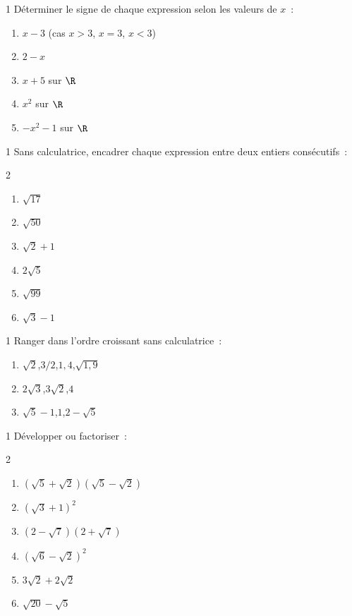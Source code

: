 \begin{exo}{1}
D\'eterminer le signe de chaque expression selon les valeurs de $x$~:
\begin{enumerate}
  \item $x - 3$ \quad (cas $x > 3$, $x = 3$, $x < 3$)
  \item $2 - x$
  \item $x + 5$ sur $\R$
  \item $x^2$ sur $\R$
  \item $-x^2 - 1$ sur $\R$
\end{enumerate}
\end{exo}

\begin{exo}{1}
Sans calculatrice, encadrer chaque expression entre deux entiers cons\'ecutifs~:
\begin{multicols}{2}
\begin{enumerate}
  \item $\sqrt{17}$
  \item $\sqrt{50}$
  \item $\sqrt{2}+1$
  \item $2\sqrt{5}$
  \item $\sqrt{99}$
  \item $\sqrt{3}-1$
\end{enumerate}
\end{multicols}
\end{exo}

\begin{exo}{1}
Ranger dans l'ordre croissant sans calculatrice~:
\begin{enumerate}
  \item $\sqrt{2}$,\quad $3/2$,\quad $1{,}4$,\quad $\sqrt{1{,}9}$
  \item $2\sqrt{3}$,\quad $3\sqrt{2}$,\quad $4$
  \item $\sqrt{5}-1$,\quad $1$,\quad $2-\sqrt{5}$
\end{enumerate}
\end{exo}

\begin{exo}{1}
D\'evelopper ou factoriser~:
\begin{multicols}{2}
\begin{enumerate}
  \item $(\sqrt{5}+\sqrt{2})(\sqrt{5}-\sqrt{2})$
  \item $(\sqrt{3}+1)^2$
  \item $(2-\sqrt{7})(2+\sqrt{7})$
  \item $(\sqrt{6}-\sqrt{2})^2$
  \item $3\sqrt{2}+2\sqrt{2}$
  \item $\sqrt{20}-\sqrt{5}$
\end{enumerate}
\end{multicols}
\end{exo}


